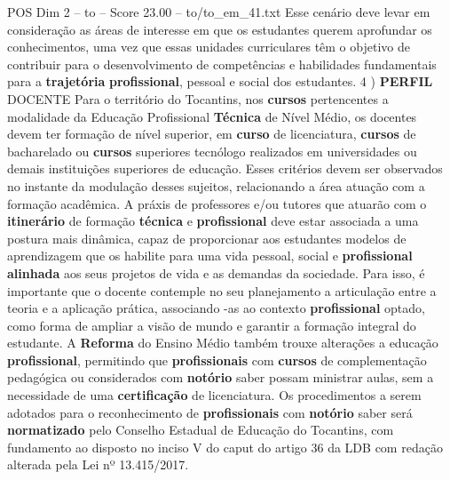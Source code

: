 \begin{textsample}{POS Dim 2 – to – Score 23.00 – to/to\_em\_41.txt}
Esse cenário deve levar em consideração as áreas de interesse em que os estudantes querem aprofundar os conhecimentos, uma vez que essas unidades curriculares têm o objetivo de contribuir para o desenvolvimento de competências e habilidades fundamentais para a \textbf{trajetória} \textbf{profissional}, pessoal e social dos estudantes. 4 ) \textbf{PERFIL} DOCENTE Para o território do Tocantins, nos \textbf{cursos} pertencentes a modalidade da Educação Profissional \textbf{Técnica} de Nível Médio, os docentes devem ter formação de nível superior, em \textbf{curso} de licenciatura, \textbf{cursos} de bacharelado ou \textbf{cursos} superiores tecnólogo realizados em universidades ou demais instituições superiores de educação.
Esses critérios devem ser observados no instante da modulação desses sujeitos, relacionando a área atuação com a formação acadêmica.
A práxis de professores e/ou tutores que atuarão com o \textbf{itinerário} de formação \textbf{técnica} e \textbf{profissional} deve estar associada a uma postura mais dinâmica, capaz de proporcionar aos estudantes modelos de aprendizagem que os habilite para uma vida pessoal, social e \textbf{profissional} \textbf{alinhada} aos seus projetos de vida e as demandas da sociedade.
Para isso, é importante que o docente contemple no seu planejamento a articulação entre a teoria e a aplicação prática, associando -as ao contexto \textbf{profissional} optado, como forma de ampliar a visão de mundo e garantir a formação integral do estudante.
A \textbf{Reforma} do Ensino Médio também trouxe alterações a educação \textbf{profissional}, permitindo que \textbf{profissionais} com \textbf{cursos} de complementação pedagógica ou considerados com \textbf{notório} saber possam ministrar aulas, sem a necessidade de uma \textbf{certificação} de licenciatura.
Os procedimentos a serem adotados para o reconhecimento de \textbf{profissionais} com \textbf{notório} saber será \textbf{normatizado} pelo Conselho Estadual de Educação do Tocantins, com fundamento ao disposto no inciso V do caput do artigo 36 da LDB com redação alterada pela Lei nº 13.415/2017.

\end{textsample}
